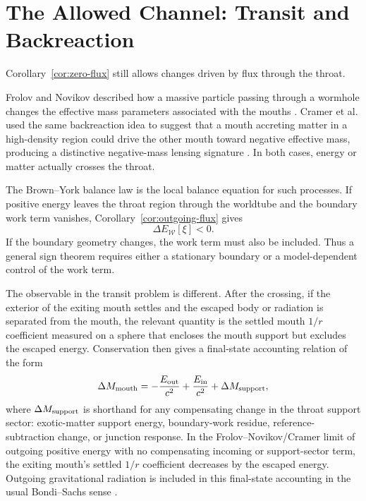 \documentclass[aps,prd,10pt,onecolumn,nofootinbib,superscriptaddress,floatfix]{revtex4-2}
\begin{document}
\section{The Allowed Channel: Transit and Backreaction}
\label{sec:transit}

Corollary~\ref{cor:zero-flux} still allows changes driven by flux
through the throat.

Frolov and Novikov described how a massive particle passing through a wormhole
changes the effective mass parameters associated with the mouths
\cite{FrolovNovikov1990PhysicalEffects}.  Cramer et al. used the same
backreaction idea to suggest that a mouth accreting matter in a high-density
region could drive the other mouth toward negative effective mass, producing a
distinctive negative-mass lensing signature
\cite{CramerEtAl1995NaturalWormholes}.  In both cases, energy or matter
actually crosses the throat.

The Brown--York balance law is the local balance equation for such processes.
If positive energy leaves the throat region through the worldtube and the
boundary work term vanishes, Corollary~\ref{cor:outgoing-flux} gives
\begin{equation}
  \Delta E_{\mathcal W}[\xi]<0.
\end{equation}
If the boundary geometry changes, the work term must also be included.  Thus a
general sign theorem requires either a stationary boundary or a model-dependent
control of the work term.

The observable in the transit problem is different.  After the crossing, if the
exterior of the exiting mouth settles and the escaped body or radiation is
separated from the mouth, the relevant quantity is the settled mouth $1/r$
coefficient measured on a sphere that encloses the mouth support but excludes
the escaped energy.  Conservation then gives a final-state accounting relation
of the form
\begin{equation}
  \Delta M_{\rm mouth}
  =
  -\frac{E_{\rm out}}{c^2}
  +\frac{E_{\rm in}}{c^2}
  +\Delta M_{\rm support},
\end{equation}
where $\Delta M_{\rm support}$ is shorthand for any compensating change in the
throat support sector: exotic-matter support energy, boundary-work residue,
reference-subtraction change, or junction response.  In the
Frolov--Novikov/Cramer limit of outgoing positive energy with no compensating
incoming or support-sector term, the exiting mouth's settled $1/r$ coefficient
decreases by the escaped energy.  Outgoing gravitational radiation is included
in this final-state accounting in the usual Bondi--Sachs sense
\cite{BondiVanderBurgMetzner1962Gravitational,Sachs1962Asymptotic}.
\end{document}
